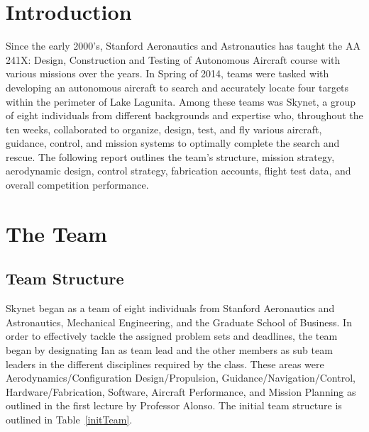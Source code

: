 \documentclass[11pt]{article}
\begin{document}
\clearpage
\tableofcontents
\vfill
\clearpage

\section{Introduction}
	\label{Introduction}
	Since the early 2000's, Stanford Aeronautics and Astronautics has taught the AA 241X: Design, Construction and Testing of Autonomous Aircraft course with various missions over the years. In Spring of 2014, teams were tasked with developing an autonomous aircraft to search and accurately locate four targets within the perimeter of Lake Lagunita. Among these teams was Skynet, a group of eight individuals from different backgrounds and expertise who, throughout the ten weeks, collaborated to organize, design, test, and fly various aircraft, guidance, control, and mission systems to optimally complete the search and rescue. The following report outlines the team's structure, mission strategy, aerodynamic design, control strategy, fabrication accounts, flight test data, and overall competition performance.

	\section{The Team}
		\label{Team}
		\subsection{Team Structure}
		\label{TeamStrc}
		Skynet began as a team of eight individuals from Stanford Aeronautics and Astronautics, Mechanical Engineering, and the Graduate School of Business. In order to effectively tackle the assigned problem sets and deadlines, the team began by designating Ian as team lead and the other members as sub team leaders in the different disciplines required by the class. These areas were Aerodynamics/Configuration Design/Propulsion, Guidance/Navigation/Control, Hardware/Fabrication, Software, Aircraft Performance, and Mission Planning as outlined in the first lecture by Professor Alonso. The initial team structure is outlined in Table~\ref{initTeam}.
\end{document}
